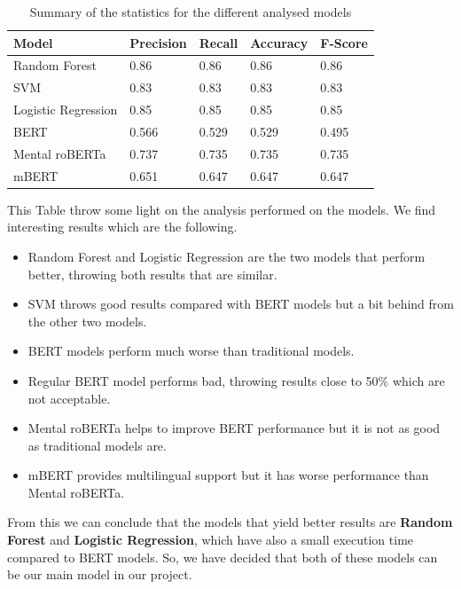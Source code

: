 \begin{table}[h]
\centering
\begin{tabular}{|l|l|l|l|l|}
\hline
\textbf{Model}      & \textbf{Precision} & \textbf{Recall} & \textbf{Accuracy} & \textbf{F-Score} \\ \hline
Random Forest       & 0.86               & 0.86            & 0.86              & 0.86             \\ \hline
SVM                 & 0.83               & 0.83            & 0.83              & 0.83             \\ \hline
Logistic Regression & 0.85               & 0.85            & 0.85              & 0.85             \\ \hline
BERT                & 0.566              & 0.529           & 0.529             & 0.495            \\ \hline
Mental roBERTa      & 0.737              & 0.735           & 0.735             & 0.735            \\ \hline
mBERT               & 0.651              & 0.647           & 0.647             & 0.647            \\ \hline
\end{tabular}
\caption{Summary of the statistics for the different analysed models}
\label{tab:summarystatistics}
\end{table}

This Table throw some light on the analysis performed on the models. We find interesting results which are the following.

\begin{itemize}
    \item Random Forest and Logistic Regression are the two models that perform better, throwing both results that are similar.
    \item SVM throws good results compared with BERT models but a bit behind from the other two models.
    \item BERT models perform much worse than traditional models.
    \item Regular BERT model performs bad, throwing results close to 50\% which are not acceptable.
    \item Mental roBERTa helps to improve BERT performance but it is not as good as traditional models are.
    \item mBERT provides multilingual support but it has worse performance than Mental roBERTa.
\end{itemize}

From this we can conclude that the models that yield better results are \textbf{Random Forest} and \textbf{Logistic Regression}, which have also a small execution time compared to BERT models. So, we have decided that both of these models can be our main model in our project. 

